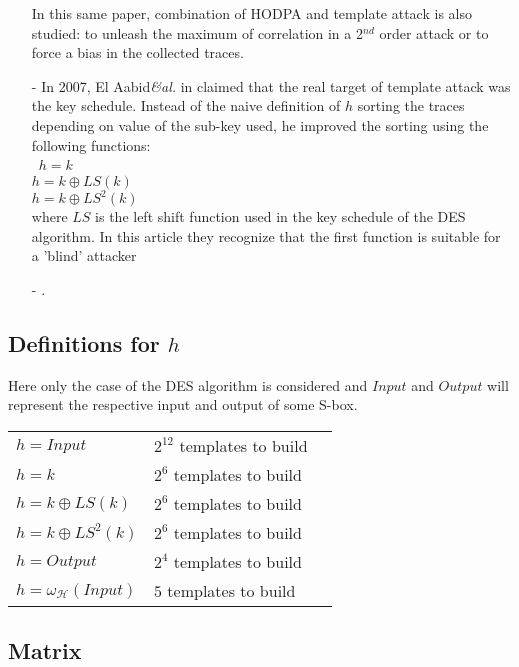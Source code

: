 \begin{itemize}
In this same paper, combination of HODPA and template attack is also studied: to
unleash the maximum of correlation in a 2$^{nd}$ order attack or to force a bias 
in the collected traces. 

	\item[-] In 2007, El Aabid\textit{\&al.} in 
	claimed that the real target of template attack was the key schedule. 
Instead of the naive definition of $h$ sorting the traces depending on value of the sub-key used,
he improved the sorting using the following functions:\\\
$h= k $\\
$h= k \oplus LS(k)  $\\
$h= k \oplus LS^2(k)  $\\
where $LS$	is the left shift function used in the key schedule of the DES algorithm. 
In this article  they recognize that the first function is suitable for a 'blind' attacker

\item[-] .
\end{itemize}

\subsection*{Definitions for $h$}
Here only the case of the DES algorithm is considered and 
$Input$ and $Output$ will represent the respective input and output of some S-box.

			\begin{tabularx}{\linewidth}{ p{4cm}  p{4cm}  p{4cm}}
			$ h  = Input$						& $2^{12}$ templates to build& \\
			$ h  = k $ 							& $2^{6}$ templates to build& \\
			$ h  = k \oplus LS(k)  $ 			& $2^{6}$ templates to build& \\
			$ h  = k \oplus LS^2(k)  $ 			& $2^{6}$ templates to build& \\
			$ h  = Output $						& $2^{4}$ templates to build& \\
			$ h  = \omega_\mathcal{H}(Input) $ 	& $5$ templates to build& 
			\end{tabularx}	
			
			
\subsection*{Matrix}

